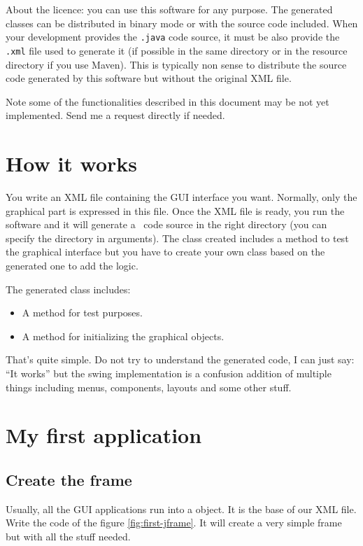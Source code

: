 About the licence: you can use this software for any purpose. The generated
classes can be distributed in binary mode or with the source code included. When
your development provides the \verb|.java| code source, it must be also
provide the \verb|.xml| file used to generate it (if possible in the
same directory or in the resource directory if you use Maven). This is typically non sense to distribute the source code
generated by this software but without the original XML file.

Note some of the functionalities described in this document
may be not yet implemented. Send me a request directly if needed.

\section{How it works}
You write an XML file containing the GUI interface you want. Normally, only
the graphical part is expressed in this file. Once the XML file is ready, you
run the software and it will generate a \JAVA\ code source in the
right directory (you can specify the directory in arguments). The class created
includes a  method to test the graphical interface but you
have to create your own class based on the generated one to add the logic.
 

The generated class includes:
\begin{itemize}
  \item A  method for test purposes.
  \item A  method for initializing the graphical objects.
\end{itemize}


That's quite simple. Do not try to understand the generated code, I can
just say: ``It works'' but the swing implementation is a confusion addition
of multiple things including menus, components, layouts and some other
stuff.

\section{My first application}

\subsection{Create the frame}
Usually, all the GUI applications run into a  object.
It is the base of our XML file. Write the code of the figure \ref{fig:first-jframe}.
It will create a very simple frame but with all the stuff needed.

